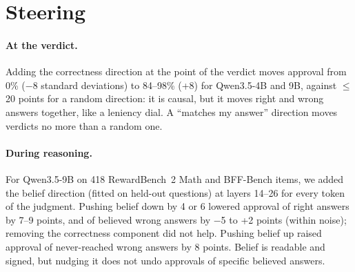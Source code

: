 \documentclass[11pt]{article}
\begin{document}
\begin{table}[h]
\centering
\small
{}
\caption{Cosine of belief and correctness directions, disjoint halves of questions, audited labels. Before the
audit the judge column read 0.63 and 0.62 (BBEH) and 0.80 and 0.49 (BFF). RewardBench~2 Math has 9 believed wrong
answers per model and is omitted.}
\label{tab:inside-all}
\end{table}

\section{Steering}
\label{app:steering}

\paragraph{At the verdict.} Adding the correctness direction at the point of the verdict moves approval from 0\%
($-$8 standard deviations) to 84--98\% (+8) for Qwen3.5-4B and 9B, against $\leq$20 points for a random direction:
it is causal, but it moves right and wrong answers together, like a leniency dial. A ``matches my answer''
direction moves verdicts no more than a random one.

\paragraph{During reasoning.} For Qwen3.5-9B on 418 RewardBench~2 Math and BFF-Bench items, we added the belief
direction (fitted on held-out questions) at layers 14--26 for every token of the judgment. Pushing belief down by 4
or 6 lowered approval of right answers by 7--9 points, and of believed wrong answers by $-$5 to +2 points (within
noise); removing the correctness component did not help. Pushing belief up raised approval of never-reached wrong
answers by 8 points. Belief is readable and signed, but nudging it does not undo approvals of specific believed
answers.
\end{document}
